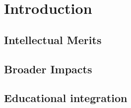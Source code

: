 \section{Introduction}



\subsection{Intellectual Merits}


\subsection{Broader Impacts}


\subsection{Educational integration}



